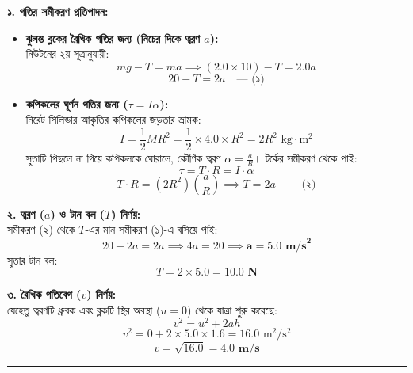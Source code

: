\documentclass[12pt, a4paper]{article}
\begin{document}
\begin{tcolorbox}[solutionbox={সমাধান (Solution)}]
\begin{center}
\end{center}
\vspace{1em}

\vspace{0.5em}
\noindent
\textbf{১. গতির সমীকরণ প্রতিপাদন:}
\begin{itemize}[leftmargin=*, parsep=0.4ex]
    \item \textbf{ঝুলন্ত ব্লকের রৈখিক গতির জন্য (নিচের দিকে ত্বরণ $a$):} \\
    নিউটনের ২য় সূত্রানুযায়ী:
    $$m g - T = m a \implies (2.0 \times 10) - T = 2.0 a$$ 
    $$20 - T = 2a \quad \text{--- (১)}$$
    
    \item \textbf{কপিকলের ঘূর্ণন গতির জন্য ($\tau = I\alpha$):} \\
    নিরেট সিলিন্ডার আকৃতির কপিকলের জড়তার ভ্রামক: 
    $$I = \frac{1}{2} M R^2 = \frac{1}{2} \times 4.0 \times R^2 = 2 R^2\text{ kg}\cdot\text{m}^2$$ 
    সুতাটি পিছলে না গিয়ে কপিকলকে ঘোরালে, কৌণিক ত্বরণ $\alpha = \frac{a}{R}$। টর্কের সমীকরণ থেকে পাই: 
    $$\tau = T \cdot R = I \cdot \alpha$$ 
    $$T \cdot R = (2 R^2) \left(\frac{a}{R}\right) \implies T = 2a \quad \text{--- (২)}$$
\end{itemize}

\vspace{0.5em}
\noindent
\textbf{২. ত্বরণ ($a$) ও টান বল ($T$) নির্ণয়:} \\
সমীকরণ (২) থেকে $T$-এর মান সমীকরণ (১)-এ বসিয়ে পাই: 
$$20 - 2a = 2a \implies 4a = 20 \implies \mathbf{a = 5.0\text{ m/s}^2}$$
সুতার টান বল: 
$$T = 2 \times 5.0 = \mathbf{10.0\text{ N}}$$

\vspace{0.5em}
\noindent
\textbf{৩. রৈখিক গতিবেগ ($v$) নির্ণয়:} \\
যেহেতু ত্বরণটি ধ্রুবক এবং ব্লকটি স্থির অবস্থা ($u = 0$) থেকে যাত্রা শুরু করেছে: 
$$v^2 = u^2 + 2 a h$$ 
$$v^2 = 0 + 2 \times 5.0 \times 1.6 = 16.0\text{ m}^2/\text{s}^2$$ 
$$v = \sqrt{16.0} = \mathbf{4.0\text{ m/s}}$$

\vspace{1.5em}
\hrule
\vspace{1.5em}


\end{tcolorbox}
\end{document}
